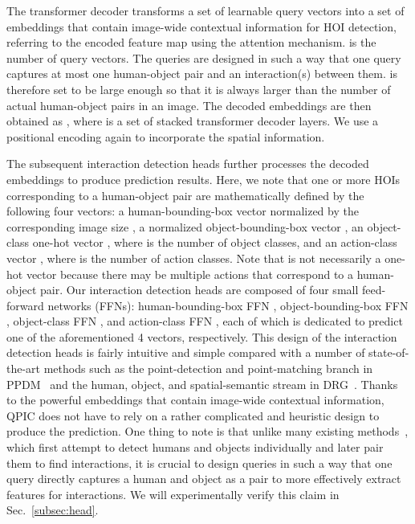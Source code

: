 \documentclass[final]{cvpr}
\begin{document}
The transformer decoder transforms a set of learnable query vectors  into a set of embeddings  that contain image-wide contextual information for HOI detection, referring to the encoded feature map  using the attention mechanism.
 is the number of query vectors.
The queries are designed in such a way that one query captures at most one human-object pair and an interaction(s) between them.
 is therefore set to be large enough so that it is always larger than the number of actual human-object pairs in an image.
The decoded embeddings are then obtained as 
,
where  is a set of stacked transformer decoder layers.
We use a positional encoding  again to incorporate the spatial information.

The subsequent interaction detection heads further processes the decoded embeddings to produce  prediction results.
Here, we note that one or more HOIs corresponding to a human-object pair are mathematically defined by the following four vectors:
 a human-bounding-box vector normalized by the corresponding image size , 
 a normalized object-bounding-box vector , 
 an object-class one-hot vector , where  is the number of object classes, 
 and an action-class vector , where  is the number of action classes.
Note that  is not necessarily a one-hot vector because there may be multiple actions that correspond to a human-object pair.
Our interaction detection heads are composed of four small feed-forward networks (FFNs):
 human-bounding-box FFN ,
 object-bounding-box FFN ,
 object-class FFN ,
 and action-class FFN , each of which is dedicated to predict one of the aforementioned 4 vectors, respectively.
This design of the interaction detection heads is fairly intuitive and simple compared with a number of state-of-the-art methods such as the point-detection and point-matching branch in PPDM~\cite{liao_cvpr2020} and the human, object, and spatial-semantic stream in DRG~\cite{gao_eccv2020}.
Thanks to the powerful embeddings that contain image-wide contextual information, QPIC does not have to rely on a rather complicated and heuristic design to produce the prediction.
One thing to note is that 
unlike many existing methods~\cite{chao_wacv2018, gao_eccv2020, gao_bmvc2018, gkioxari_cvpr2018, gupta_iccv2019, zhi_eccv2020, kim_dong_eccv2020, li_cvpr2020, li_cvpr2019, lin_ijcai2020, liu_eccv2020, ulutan_cvpr2020, wan_iccv2019, hai_eccv2020, xu_tmm2020, yang_ijcai2020, zhong_eccv2020, zhou_iccv2019, qi_eccv2018, wang_iccv2019, zhou_cvpr2020}, which first attempt to detect humans and objects individually and later pair them to find interactions, it is crucial to design queries in such a way that one query directly captures a human and object as a pair to more effectively extract features for interactions.
We will experimentally verify this claim in Sec.~\ref{subsec:head}.
\end{document}
